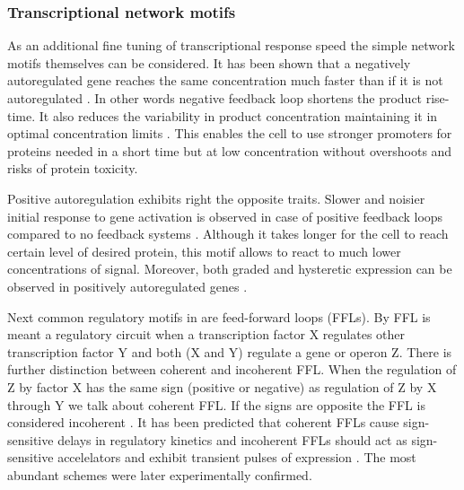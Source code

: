 \subsubsection{Transcriptional network motifs}
As an additional fine tuning of transcriptional response speed the simple network motifs themselves can be considered.
It has been shown that a negatively autoregulated gene reaches the same concentration much faster than if it is not autoregulated \cite{rosenfeld2002negative}.
In other words negative feedback loop shortens the product rise-time.
It also reduces the variability in product concentration maintaining it in optimal concentration limits \cite{becskei2000engineering}.
This enables the cell to use stronger promoters for proteins needed in a short time but at low concentration without overshoots and risks of protein toxicity.

Positive autoregulation exhibits right the opposite traits.
Slower and noisier initial response to gene activation is observed in case of positive feedback loops compared to no feedback systems \cite{maeda2006regulatory, sayut2007noise}.
Although it takes longer for the cell to reach certain level of desired protein, this motif allows to react to much lower concentrations of signal.
Moreover, both graded and hysteretic expression can be observed in positively autoregulated genes \cite{maeda2006regulatory}.

Next common regulatory motifs in  are feed-forward loops (FFLs).
By FFL is meant a regulatory circuit when a transcription factor X regulates other transcription factor Y and both (X and Y) regulate a gene or operon Z.
There is further distinction between coherent and incoherent FFL.
When the regulation of Z by factor X has the same sign (positive or negative) as regulation of Z by X through Y we talk about coherent FFL.
If the signs are opposite the FFL is considered incoherent \cite{shen2002network}.
It has been predicted that coherent FFLs cause sign-sensitive delays in regulatory kinetics and incoherent FFLs should act as sign-sensitive accelelators and exhibit transient pulses of expression \cite{mangan2003structure}.
The most abundant schemes were later experimentally confirmed.

